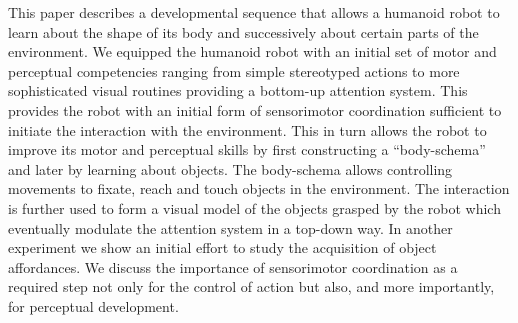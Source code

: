 This paper describes a developmental sequence that allows a humanoid robot to learn about the shape of its body and successively about certain parts of the environment. We equipped the humanoid robot with an initial set of motor and perceptual competencies ranging from simple stereotyped actions to more sophisticated visual routines providing a bottom-up attention system. This provides the robot with an initial form of sensorimotor coordination sufficient to initiate the interaction with the environment. This in turn allows the robot to improve its motor and perceptual skills by first constructing a ``body-schema'' and later by learning about objects. The body-schema allows controlling movements to fixate, reach and touch objects in the environment. The interaction is further used to form a visual model of the objects grasped by the robot which eventually modulate the attention system in a top-down way. In another experiment we show an initial effort to study the acquisition of object affordances. We discuss the importance of sensorimotor coordination as a required step not only for the control of action but also, and more importantly, for perceptual development.

